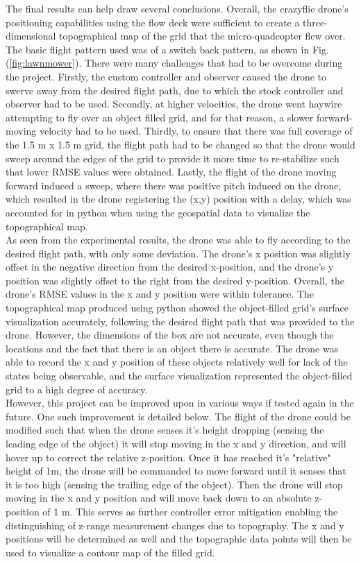 The final results can help draw several conclusions. Overall, the crazyflie drone's positioning capabilities using the flow deck were sufficient to create a three-dimensional topographical map of the grid that the micro-quadcopter flew over. The basic flight pattern used was of a switch back pattern, as shown in Fig. (\ref{fig:lawnmower}). There were many challenges that had to be overcome during the project. Firstly, the custom controller and observer caused the drone to swerve away from the desired flight path, due to which the stock controller and observer had to be used. Secondly, at higher velocities, the drone went haywire attempting to fly over an object filled grid, and for that reason, a slower forward-moving velocity had to be used. Thirdly, to ensure that there was full coverage of the 1.5 m x 1.5 m grid, the flight path had to be changed so that the drone would sweep around the edges of the grid to provide it more time to re-stabilize such that lower RMSE values were obtained. Lastly, the flight of the drone moving forward induced a sweep, where there was positive pitch induced on the drone, which resulted in the drone registering the (x,y) position with a delay, which was accounted for in python when using the geospatial data to visualize the topographical map.\\
\indent As seen from the experimental results, the drone was able to fly according to the desired flight path, with only some deviation. The drone's x position was slightly offset in the negative direction from the desired x-position, and the drone's y position was slightly offset to the right from the desired y-position. Overall, the drone's RMSE values in the x and y position were within tolerance. The topographical map produced using python showed the object-filled grid's surface visualization accurately, following the desired flight path that was provided to the drone. However, the dimensions of the box are not accurate, even though the locations and the fact that there is an object there is accurate. The drone was able to record the x and y position of these objects relatively well for lack of the states being observable, and the surface visualization represented the object-filled grid to a high degree of accuracy.\\
\indent However, this project can be improved upon in various ways if tested again in the future. One such improvement is detailed below. The flight of the drone could be modified such that when the drone senses it’s height dropping (sensing the leading edge of the object) it will stop moving in the x and y direction, and will hover up to correct the relative z-position. Once it has reached it’s "relative" height of 1m, the drone will be commanded to move forward until it senses that it is too high (sensing the trailing edge of the object). Then the drone will stop moving in the x and y position and will move back down to an absolute z-position of 1 m. This serves as further controller error mitigation enabling the distinguishing of z-range measurement changes due to topography. The x and y positions will be determined as well and the topographic data points will then be used to visualize a contour map of the filled grid.

